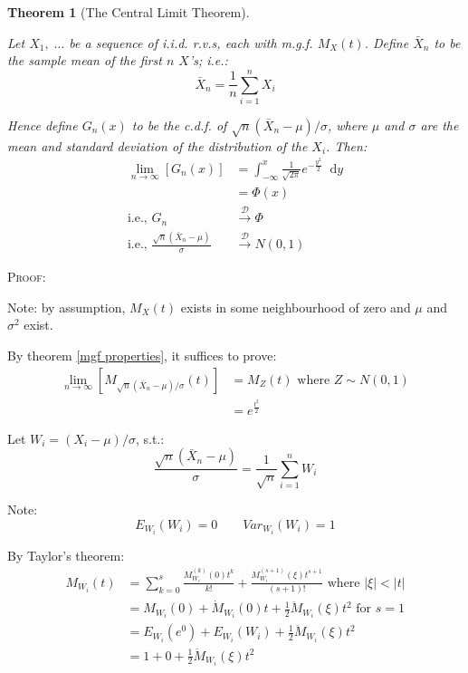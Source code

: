 \documentclass[12pt,a4paper]{article}
\newtheorem{thm}{Theorem}[subsection]
\newcommand{\diff}{\;\mathrm{d}}
\begin{document}
\begin{thm}[The Central Limit Theorem]$\;$\par\vspace{1cm}

Let $X_1,\;\hdots$ be a sequence of i.i.d. r.v.s, each with m.g.f. $M_X(t)$. Define $\bar{X}_n$ to be the sample mean of the first $n$ $X$'s; i.e.:
$$\bar{X}_n = \frac{1}{n}\sum_{i=1}^n X_i$$

Hence define $G_n(x)$ to be the c.d.f. of $\sqrt{n}(\bar{X}_n -\mu)/\sigma$, where $\mu$ and $\sigma$ are the mean and standard deviation of the distribution of the $X_i$. Then:
\begin{align*}
\lim_{n\to\infty}\left[G_n(x)\right] &= \int_{-\infty}^{x}\!\! \frac{1}{\sqrt{2\pi}}e^{-\frac{y^2}{2}}\;\diff y\\
&= \Phi(x)\\
\text{i.e., } G_n &\xrightarrow{\mathscr{D}} \Phi\\
\text{i.e., } \frac{\sqrt{n}\left(\bar{X}_n -\mu\right)}{\sigma} &\xrightarrow{\mathscr{D}} N(0,1)
\end{align*}

\end{thm}

\noindent\textsc{Proof:}\par\vspace{1cm}

Note: by assumption, $M_X(t)$ exists in some neighbourhood of zero and $\mu$ and $\sigma^2$ exist.

By theorem \ref{mgf properties}, it suffices to prove:
\begin{align*}
\lim_{n\to\infty}\left[M_{\sqrt{n}\left(\bar{X}_n -\mu\right)/\sigma}(t)\right] &= M_Z(t) \mbox{ where $Z\sim N(0,1)$}\\
&= e^{\frac{t^2}{2}}
\end{align*}

Let $W_i =\left(X_i-\mu\right)/\sigma$, s.t.:
$$\frac{\sqrt{n}\left(\bar{X}_n-\mu\right)}{\sigma} = \frac{1}{\sqrt{n}}\sum_{i=1}^n W_i$$

Note:
$$E_{W_i}(W_i) = 0 \qquad Var_{W_i}(W_i) = 1$$

By Taylor's theorem:
\begin{align*}
M_{W_i}(t) &= \sum_{k=0}^s \frac{M_{W_i}^{(k)}(0)t^k}{k!} + \frac{M_{W_i}^{(s+1)}\left(\xi\right)t^{s+1}}{(s+1)!} \mbox{ where $\left|\xi\right|<|t|$}\\
&= M_{W_i}(0) + \dot{M}_{W_i}(0)t + \frac{1}{2}\ddot{M}_{W_i}\left(\xi\right)t^2 \mbox{ for $s=1$}\\
&= E_{W_i}\left(e^0\right) + E_{W_i}\left(W_i\right) + \frac{1}{2}\ddot{M}_{W_i}\left(\xi\right)t^2\\
&= 1 + 0 + \frac{1}{2}\ddot{M}_{W_i}\left(\xi\right)t^2
\end{align*}
\end{document}
